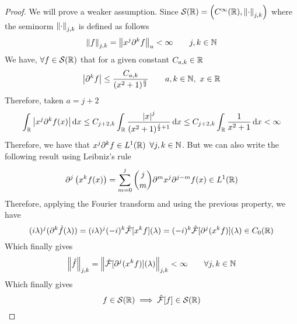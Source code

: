 \documentclass[../complete.tex]{subfiles}
\begin{document}
\begin{proof}
	We will prove a weaker assumption. Since $\mathcal{S}(\mathbb{R})=\left(C^\infty(\mathbb{R}),\norm{\cdot}_{j,k}\right)$ where the seminorm $\norm{\cdot}_{j,k}$ is defined as follows
	\begin{equation*}
		\norm{f}_{j,k}=\norm{x^j\partial^kf}_u<\infty\qquad j,k\in\mathbb{N}
	\end{equation*}
	We have, $\forall f\in\mathcal{S}(\mathbb{R})$ that for a given constant $C_{a,k}\in\mathbb{R}$
	\begin{equation*}
		\abs{\partial^kf}\le\frac{C_{a,k}}{(x^2+1)^{\frac{a}{2}}}\qquad a,k\in\mathbb{N},\ x\in\mathbb{R}
	\end{equation*}
	Therefore, taken $a=j+2$
	\begin{equation*}
		\int_{\mathbb{R}}^{}\abs{x^j\partial^kf(x)}\operatorname{d\!} x\le C_{j+2,k}\int_{\mathbb{R}}^{}\frac{\abs{x}^j}{(x^2+1)^{\frac{j}{2}+1}}\operatorname{d\!} x\le C_{j+2,k}\int_{\mathbb{R}}^{}\frac{1}{x^2+1}\operatorname{d\!} x<\infty
	\end{equation*}
	Therefore, we have that $x^j\partial^kf\in L^1(\mathbb{R})$ $\forall j,k\in\mathbb{N}$. But we can also write the following result using Leibniz's rule
	\begin{equation*}
		\partial^j\left( x^kf(x) \right)=\sum_{m=0}^{j}\binom{j}{m}\partial^mx^j\partial^{j-m}f(x)\in L^1(\mathbb{R})
	\end{equation*}
	Therefore, applying the Fourier transform and using the previous property, we have
	\begin{equation*}
		(i\lambda)^j(\partial^k\hat{f}(\lambda))=(i\lambda)^j(-i)^k\hat{\mathcal{F}}[x^kf](\lambda)=(-i)^k\hat{\mathcal{F}}[\partial^j(x^kf)](\lambda)\in C_0(\mathbb{R})
	\end{equation*}
	Which finally gives
	\begin{equation*}
		\norm{\hat{f}}_{j,k}=\norm{\hat{\mathcal{F}}[\partial^j(x^kf)](\lambda)}_{j,k}<\infty\qquad\forall j,k\in\mathbb{N}
	\end{equation*}
	Which finally gives
	\begin{equation*}
		f\in\mathcal{S}(\mathbb{R})\implies\hat{\mathcal{F}}[f]\in\mathcal{S}(\mathbb{R})
	\end{equation*}
\end{proof}
\end{document}
